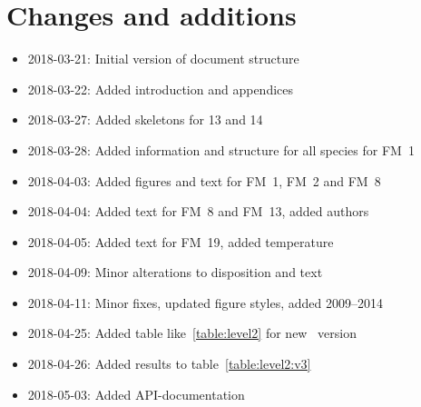 \chapter{Changes and additions}
\label{ch:changes}

\begin{itemize}
    \item 2018-03-21: Initial version of document structure
    \item 2018-03-22: Added introduction and appendices
    \item 2018-03-27: Added skeletons for 13 and 14
    \item 2018-03-28: Added information and structure for all species for FM~1
    \item 2018-04-03: Added figures and text for FM~1, FM~2 and FM~8
    \item 2018-04-04: Added text for FM~8 and FM~13, added authors
    \item 2018-04-05: Added text for FM~19, added temperature
    \item 2018-04-09: Minor alterations to disposition and text
    \item 2018-04-11: Minor fixes, updated figure styles, added 2009--2014
    \item 2018-04-25: Added table like~\ref{table:level2} for new \smr~version
    \item 2018-04-26: Added results to table~\ref{table:level2:v3}
    \item 2018-05-03: Added API-documentation
\end{itemize}
